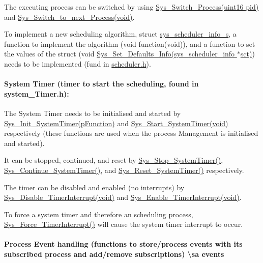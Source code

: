 \begin{DoxyItemize}
\item The executing process can be switched by using \hyperlink{process__Management_8h_a212e8074575988bbe55cefd52a9ae504}{Sys\+\_\+\+Switch\+\_\+\+Process(uint16 pid)} and \hyperlink{process__Management_8h_aed6f39a867fac05effd63289b304ced1}{Sys\+\_\+\+Switch\+\_\+to\+\_\+next\+\_\+\+Process(void)}.
\item To implement a new scheduling algorithm, struct \hyperlink{structsys__scheduler__info__s}{sys\+\_\+scheduler\+\_\+info\+\_\+s}, a function to implement the algorithm (void function(void)), and a function to set the values of the struct (void \hyperlink{scheduler_8h_a8992c7e866ac510c5db6ac1f1b00f324}{Sys\+\_\+\+Set\+\_\+\+Defaults\+\_\+\+Info(sys\+\_\+scheduler\+\_\+info $\ast$sct)}) needs to be implemented (fund in \hyperlink{scheduler_8h}{scheduler.\+h}). 
\end{DoxyItemize}\hypertarget{group__process_process_timer}{}\paragraph{System Timer (timer to start the scheduling, found in system\+\_\+\+Timer.\+h)\+:}\label{group__process_process_timer}

\begin{DoxyEnumerate}
\item The System Timer needs to be initialised and started by \hyperlink{system__Timer_8h_a43fb10a158f96d4512ffa1fdddfe28ec}{Sys\+\_\+\+Init\+\_\+\+System\+Timer(p\+Function)} and \hyperlink{system__Timer_8h_afc0f400adea75936546abe01771ee9b2}{Sys\+\_\+\+Start\+\_\+\+System\+Timer(void)} respectively (these functions are used when the process Management is initialised and started).
\item It can be stopped, continued, and reset by \hyperlink{system__Timer_8c_a2c6bd2b2521ccaeeae10827c5e626f84}{Sys\+\_\+\+Stop\+\_\+\+System\+Timer()}, \hyperlink{system__Timer_8c_ab2fcca740eab21a9412fc9ec44aa7c69}{Sys\+\_\+\+Continue\+\_\+\+System\+Timer()}, and \hyperlink{system__Timer_8c_adae83d87319518b33a7cdd6e01adc546}{Sys\+\_\+\+Reset\+\_\+\+System\+Timer()} respectively.
\item The timer can be disabled and enabled (no interrupts) by \hyperlink{system__Timer_8h_a038b8f0be088220d0aabc6a13a4769e3}{Sys\+\_\+\+Disable\+\_\+\+Timer\+Interrupt(void)} and \hyperlink{system__Timer_8h_a27a2d4e84310e08b6b8e50c5e7b9cb2b}{Sys\+\_\+\+Enable\+\_\+\+Timer\+Interrupt(void)}.
\item To force a system timer and therefore an scheduling process, \hyperlink{system__Timer_8c_a8ea6aac01f3a93fbbe5b5d03f35b23bd}{Sys\+\_\+\+Force\+\_\+\+Timer\+Interrupt()} will cause the system timer interrupt to occur. 
\end{DoxyEnumerate}\hypertarget{group__process_process_event}{}\paragraph{Process Event handling (functions to store/process events with it\textquotesingle{}s subscribed process and add/remove subscriptions) \textbackslash{}sa events}\label{group__process_process_event}

